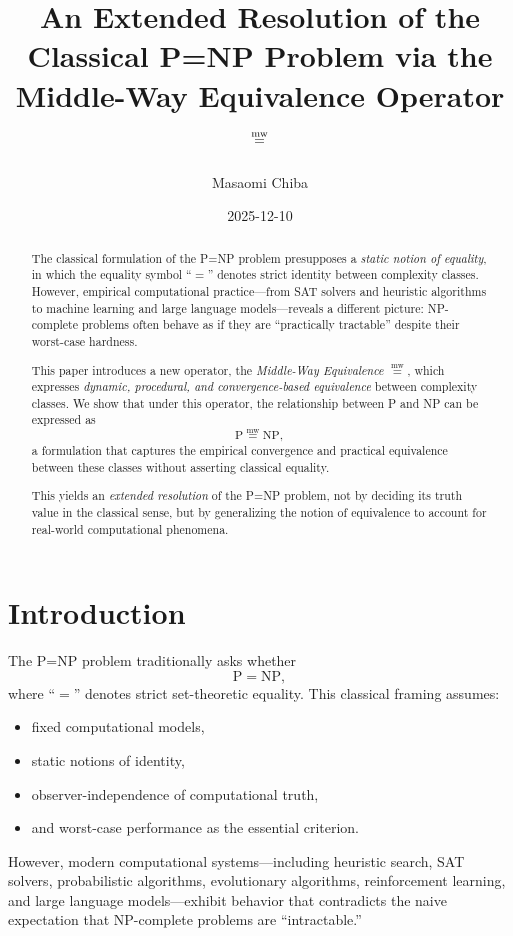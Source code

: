 \documentclass[12pt]{article}
\title{An Extended Resolution of the Classical P=NP Problem via the Middle-Way Equivalence Operator $\mweq$}
\author{Masaomi Chiba}
\date{2025-12-10}
\newcommand{\mweq}{\mathrel{\overset{\mathrm{mw}}{=}}}
\begin{document}
\maketitle

\begin{abstract}
The classical formulation of the P=NP problem presupposes a \emph{static notion of equality},
in which the equality symbol ``$=$'' denotes strict identity between complexity classes. 
However, empirical computational practice---from SAT solvers and heuristic algorithms 
to machine learning and large language models---reveals a different picture: 
NP-complete problems often behave as if they are ``practically tractable'' despite their 
worst-case hardness.

This paper introduces a new operator, the \emph{Middle-Way Equivalence} $\mweq$, 
which expresses \emph{dynamic, procedural, and convergence-based equivalence} 
between complexity classes. 
We show that under this operator, the relationship between P and NP can be expressed as
\[
\mathrm{P} \mweq \mathrm{NP},
\]
a formulation that captures the empirical convergence and practical equivalence 
between these classes without asserting classical equality.

This yields an \emph{extended resolution} of the P=NP problem, not by deciding 
its truth value in the classical sense, but by generalizing the notion of equivalence 
to account for real-world computational phenomena.
\end{abstract}

\section{Introduction}

The P=NP problem traditionally asks whether
\[
\mathrm{P} = \mathrm{NP},
\]
where ``$=$'' denotes strict set-theoretic equality. 
This classical framing assumes:

\begin{itemize}
    \item fixed computational models,
    \item static notions of identity,
    \item observer-independence of computational truth,
    \item and worst-case performance as the essential criterion.
\end{itemize}

However, modern computational systems---including heuristic search,
SAT solvers, probabilistic algorithms, evolutionary algorithms,
reinforcement learning, and large language models---exhibit behavior
that contradicts the naive expectation that NP-complete problems are ``intractable.''
\end{document}
